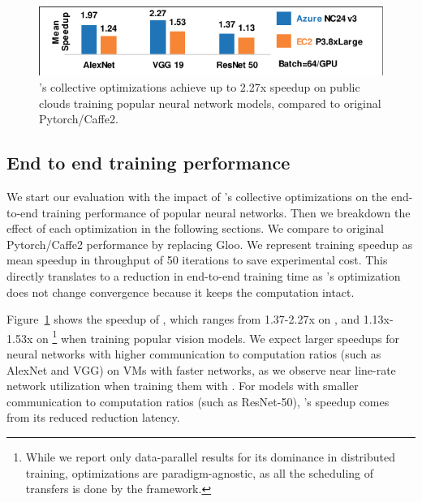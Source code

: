 
\begin{figure}[t!]
	\centering
	\includegraphics[width=.5\linewidth, trim=2 1 1 3,clip]{Figures/end2end.pdf}
	\caption{\plink{}'s collective optimizations achieve up to 2.27x speedup on  public clouds training popular neural network models, compared to original Pytorch/Caffe2.}
	\label{fig:end2end}
\end{figure}


\subsection{End to end training performance}
We start our evaluation with the impact of \plink{}'s collective optimizations on the end-to-end training performance of popular neural networks. Then we breakdown the effect of each optimization in the following sections. We compare \plink{} to original Pytorch/Caffe2 performance by replacing Gloo. We represent training speedup as mean speedup in throughput of 50 iterations to save experimental cost. This directly translates to a reduction in end-to-end training time as \plink{}'s optimization does not change convergence because it keeps the computation intact. %

Figure~\ref{fig:end2end} shows the speedup of \plink, which ranges from 1.37-2.27x on \azure, and 1.13x-1.53x on \ectwo\footnote{While we report only data-parallel results for its dominance in distributed training, \plink optimizations are paradigm-agnostic, as all the scheduling of transfers is done by the framework.} when training popular vision models. We expect larger speedups for neural networks with higher communication to computation ratios (such as AlexNet and VGG) on VMs with faster networks, as we observe near line-rate network utilization when training them with \plink. For models with smaller communication to computation ratios (such as ResNet-50), \plink{}'s speedup comes from its reduced reduction latency.

